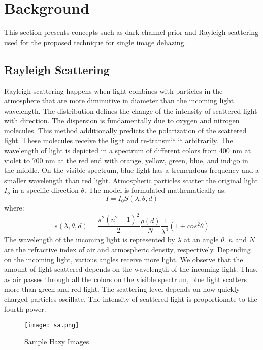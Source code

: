 \documentclass[doctor,english,listoffigures,listoftables]{thesis-uestc}
\begin{document}
\section{Background} \label{bk} 
This section presents concepts such as dark channel prior and Rayleigh scattering used for the proposed technique for single image dehazing. 

\subsection{Rayleigh Scattering}
Rayleigh scattering happens when light combines with particles in the atmosphere that are more diminutive in diameter than the incoming light wavelength. The distribution defines the change of the intensity of scattered light with direction. The dispersion is fundamentally due to oxygen and nitrogen molecules. This method additionally predicts the polarization of the scattered light. These molecules receive the light and re-transmit it arbitrarily. The wavelength of light is depicted in a spectrum of different colors from 400 nm at violet to 700 nm at the red end with orange, yellow, green, blue, and indigo in the middle. On the visible spectrum, blue light has a tremendous frequency and a smaller wavelength than red light. Atmospheric particles scatter the original light $I_o$ in a specific direction $\theta$. The model is formulated mathematically as:
\begin{equation}\label{rayleigh}
	I=I_0 S(\lambda,\theta,d)
\end{equation}
where:
\begin{equation}\label{rayleigh1}
	s(\lambda,\theta,d)=\frac{\pi^2(n^2-1)^2}{2} \frac{\rho(d)}{N} \frac{1}{\lambda ^4} (1+cos^2\theta)
\end{equation}
The wavelength of the incoming light is represented by $\lambda$  at an angle $\theta$. $n$ and $N$ are the refractive index of air and atmospheric density, respectively. Depending on the incoming light, various angles receive more light. We observe that the amount of light scattered depends on the wavelength of the incoming light. Thus, as air passes through all the colors on the visible spectrum, blue light scatters more than green and red light. The scattering level depends on how quickly charged particles oscillate. The intensity of scattered light is proportionate to the fourth power.

\begin{figure}[H]
	\centering
	\texttt{[image: sa.png]}
	\caption{Sample Hazy Images}
	\label{figsa}
\end{figure}
\end{document}
